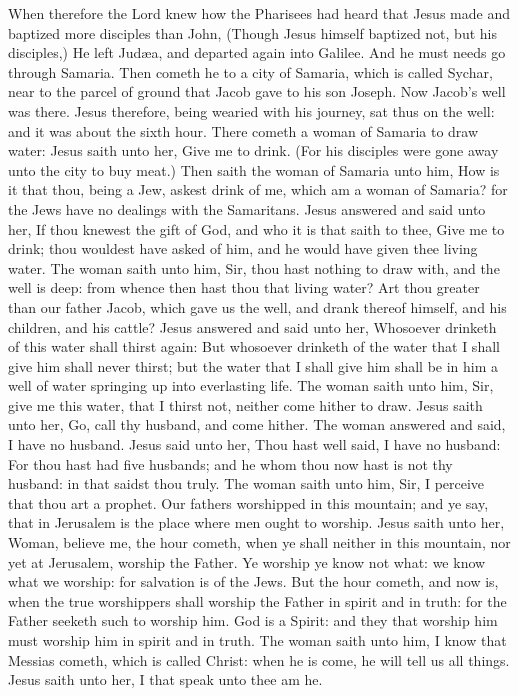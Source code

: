  When therefore the Lord knew how the Pharisees had heard
that Jesus made and baptized more disciples than John, 
(Though Jesus himself baptized not, but his disciples,) 
He left Judæa, and departed again into Galilee.  And he
must needs go through Samaria.  Then cometh he to a city
of Samaria, which is called Sychar, near to the parcel of ground that
Jacob gave to his son Joseph.  Now Jacob's well was there.
Jesus therefore, being wearied with his journey, sat thus on the well:
and it was about the sixth hour.  There cometh a woman of
Samaria to draw water: Jesus saith unto her, Give me to drink.
 (For his disciples were gone away unto the city to buy
meat.)  Then saith the woman of Samaria unto him, How is
it that thou, being a Jew, askest drink of me, which am a woman of
Samaria? for the Jews have no dealings with the Samaritans.
 Jesus answered and said unto her, If thou knewest the
gift of God, and who it is that saith to thee, Give me to drink; thou
wouldest have asked of him, and he would have given thee living water.
 The woman saith unto him, Sir, thou hast nothing to draw
with, and the well is deep: from whence then hast thou that living
water?  Art thou greater than our father Jacob, which
gave us the well, and drank thereof himself, and his children, and his
cattle?  Jesus answered and said unto her, Whosoever
drinketh of this water shall thirst again:  But whosoever
drinketh of the water that I shall give him shall never thirst; but the
water that I shall give him shall be in him a well of water springing up
into everlasting life.  The woman saith unto him, Sir,
give me this water, that I thirst not, neither come hither to draw.
 Jesus saith unto her, Go, call thy husband, and come
hither.  The woman answered and said, I have no husband.
Jesus said unto her, Thou hast well said, I have no husband:
 For thou hast had five husbands; and he whom thou now
hast is not thy husband: in that saidst thou truly.  The
woman saith unto him, Sir, I perceive that thou art a prophet.
 Our fathers worshipped in this mountain; and ye say,
that in Jerusalem is the place where men ought to worship.
 Jesus saith unto her, Woman, believe me, the hour
cometh, when ye shall neither in this mountain, nor yet at Jerusalem,
worship the Father.  Ye worship ye know not what: we know
what we worship: for salvation is of the Jews.  But the
hour cometh, and now is, when the true worshippers shall worship the
Father in spirit and in truth: for the Father seeketh such to worship
him.  God is a Spirit: and they that worship him must
worship him in spirit and in truth.  The woman saith unto
him, I know that Messias cometh, which is called Christ: when he is
come, he will tell us all things.  Jesus saith unto her,
I that speak unto thee am he.

